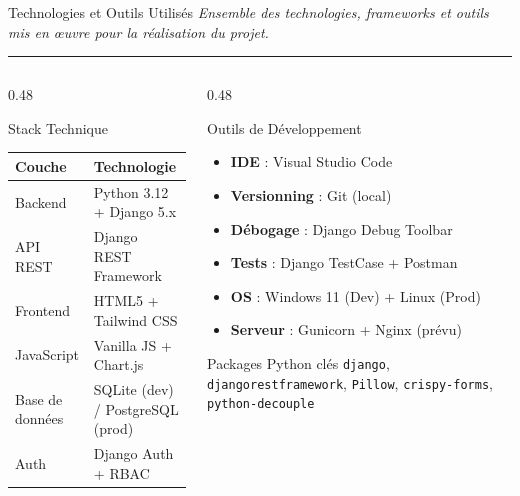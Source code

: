 \documentclass[
  aspectratio=169,       %
  xcolor=dvipsnames,     %
  t                      %
]{beamer}
\newcommand{\framedesc}[1]{%
  {\small\itshape\textcolor{PrimaryDark!80}{#1}}\par%
  \vspace{1pt}%
  {\color{PrimaryMid}\rule{\textwidth}{0.4pt}}%
  \vspace{4pt}%
}
\begin{document}
\begin{frame}{Technologies et Outils Utilisés}
  \framedesc{Ensemble des technologies, frameworks et outils mis en œuvre pour la réalisation du projet.}

  \begin{columns}[T]

    \begin{column}{0.48\textwidth}
      \begin{block}{Stack Technique}
        \begin{tabular}{ll}
          \toprule
          \textbf{Couche} & \textbf{Technologie} \\
          \midrule
          Backend          & Python 3.12 + Django 5.x \\
          API REST         & Django REST Framework \\
          Frontend         & HTML5 + Tailwind CSS \\
          JavaScript       & Vanilla JS + Chart.js \\
          Base de données  & SQLite (dev) / PostgreSQL (prod) \\
          Auth             & Django Auth + RBAC \\
          \bottomrule
        \end{tabular}
      \end{block}
    \end{column}

    \begin{column}{0.48\textwidth}
      \begin{block}{Outils de Développement}
        \begin{itemize}
          \item \textbf{IDE} : Visual Studio Code
          \item \textbf{Versionning} : Git (local)
          \item \textbf{Débogage} : Django Debug Toolbar
          \item \textbf{Tests} : Django TestCase + Postman
          \item \textbf{OS} : Windows 11 (Dev) + Linux (Prod)
          \item \textbf{Serveur} : Gunicorn + Nginx (prévu)
        \end{itemize}
      \end{block}

      \vspace{0.2cm}

      \begin{exampleblock}{Packages Python clés}
        \texttt{django}, \texttt{djangorestframework},
        \texttt{Pillow}, \texttt{crispy-forms},
        \texttt{python-decouple}
      \end{exampleblock}
    \end{column}

  \end{columns}
\end{frame}
\end{document}
